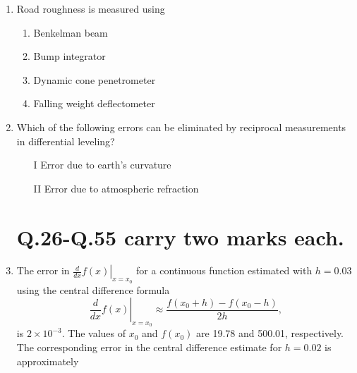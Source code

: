 \documentclass[journal]{IEEEtran}
\numberwithin{equation}{enumi}
\numberwithin{figure}{enumi}
\begin{document}
\begin{enumerate}
\item  Road roughness is measured using

\begin{enumerate}
    \item Benkelman beam
    \item Bump integrator
    \item Dynamic cone penetrometer
    \item Falling weight deflectometer
\end{enumerate}

\item Which of the following errors can be eliminated by reciprocal measurements in differential leveling?\\
        \begin{enumerate}
            \item[I] Error due to earth's curvature
            \item[II] Error due to atmospheric refraction
        \end{enumerate}

\begin{enumerate}
\end{enumerate} 
\section{Q.26-Q.55 carry two marks each.}
\item The error in $\left. \frac{d}{dx} f(x) \right|_{x = x_0}$ for a continuous function estimated with $h = 0.03$ using the central difference formula
\[
\left. \frac{d}{dx} f(x) \right|_{x = x_0} \approx \frac{f(x_0 + h) - f(x_0 - h)}{2h},
\]
is $2 \times 10^{-3}$. The values of $x_0$ and $f(x_0)$ are 19.78 and 500.01, respectively. The corresponding error in the central difference estimate for $h = 0.02$ is approximately
\begin{enumerate}
\end{enumerate}
\end{enumerate}
\end{document}
